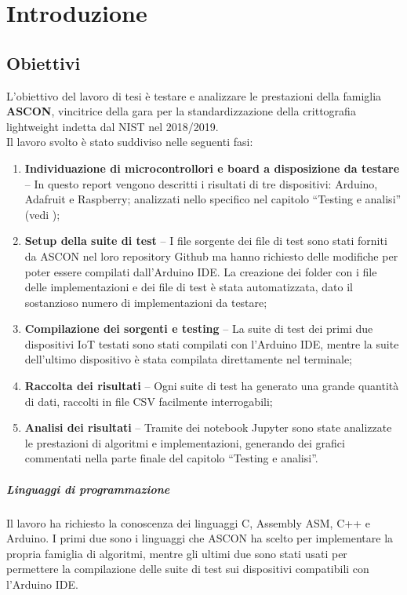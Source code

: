 \chapter{Introduzione}

\section{Obiettivi}

L'obiettivo del lavoro di tesi è testare e analizzare le prestazioni della famiglia \textbf{ASCON}, vincitrice della gara per la standardizzazione della crittografia lightweight indetta dal NIST nel 2018/2019\cite{nist-competition}. \\

\noindent Il lavoro svolto è stato suddiviso nelle seguenti fasi:
\begin{enumerate}
    \item \textbf{Individuazione di microcontrollori e board a disposizione da testare} -- In questo report vengono descritti i risultati di tre dispositivi: Arduino, Adafruit e Raspberry; analizzati nello specifico nel capitolo ``Testing e analisi'' (vedi );
    \item \textbf{Setup della suite di test} -- I file sorgente dei file di test sono stati forniti da ASCON nel loro repository Github\cite{github} ma hanno richiesto delle modifiche per poter essere compilati dall'Arduino IDE. La creazione dei folder con i file delle implementazioni e dei file di test è stata automatizzata, dato il sostanzioso numero di implementazioni da testare;
    \item \textbf{Compilazione dei sorgenti e testing} -- La suite di test dei primi due dispositivi IoT testati sono stati compilati con l'Arduino IDE, mentre la suite dell'ultimo dispositivo è stata compilata direttamente nel terminale;
    \item \textbf{Raccolta dei risultati} -- Ogni suite di test ha generato una grande quantità di dati, raccolti in file CSV facilmente interrogabili;
    \item \textbf{Analisi dei risultati} -- Tramite dei notebook Jupyter sono state analizzate le prestazioni di algoritmi e implementazioni, generando dei grafici commentati nella parte finale del capitolo ``Testing e analisi''.
\end{enumerate}
\paragraph{Linguaggi di programmazione} Il lavoro ha richiesto la conoscenza dei linguaggi C, Assembly ASM, C++ e Arduino. I primi due sono i linguaggi che ASCON ha scelto per implementare la propria famiglia di algoritmi, mentre gli ultimi due sono stati usati per permettere la compilazione delle suite di test sui dispositivi compatibili con l'Arduino IDE. \\


